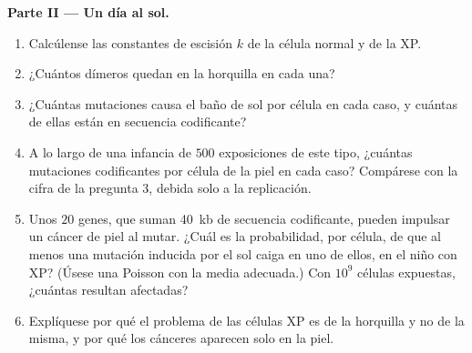 \begin{problem}
\medskip
\noindent\textbf{Parte II --- Un día al sol.}
\begin{enumerate}[resume]
  \item Calcúlense las constantes de escisión $k$ de la célula normal y
        de la XP.
  \item ¿Cuántos dímeros quedan en la horquilla en cada una?
  \item ¿Cuántas mutaciones causa el baño de sol por célula en cada caso,
        y cuántas de ellas están en secuencia codificante?
  \item A lo largo de una infancia de $500$ exposiciones de este tipo,
        ¿cuántas mutaciones codificantes por célula de la piel en cada
        caso? Compárese con la cifra de la pregunta 3, debida solo a la
        replicación.
  \item Unos $20$ genes, que suman \qty{40}{kb} de secuencia codificante,
        pueden impulsar un cáncer de piel al mutar. ¿Cuál es la
        probabilidad, por célula, de que al menos una mutación inducida
        por el sol caiga en uno de ellos, en el niño con XP? (Úsese una
        Poisson con la media adecuada.) Con $10^{9}$ células expuestas,
        ¿cuántas resultan afectadas?
  \item Explíquese por qué el problema de las células XP es de la
        horquilla y no de la  misma, y por qué los cánceres
        aparecen solo en la piel.
\end{enumerate}


\end{problem}
